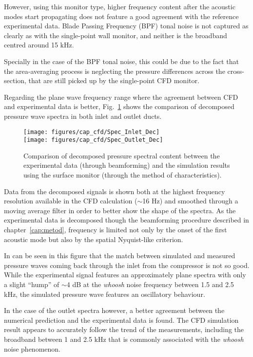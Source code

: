 However, using this monitor type, higher frequency content after the acoustic modes start propagating does not feature a good agreement with the reference experimental data. Blade Passing Frequency (BPF) tonal noise is not captured as clearly as with the single-point wall monitor, and neither is the broadband centred around 15 kHz. 

Specially in the case of the BPF tonal noise, this could be due to the fact that the area-averaging process is neglecting the pressure differences across the cross-section, that are still picked up by the single-point CFD monitor.

Regarding the plane wave frequency range where the agreement between CFD and experimental data is better, Fig.~\ref{fig:cfd_Spec_PlaneW_Dec} shows the comparison of decomposed pressure wave spectra in both inlet and outlet ducts. 

\begin{figure}[htb!]
\centering
\texttt{[image: figures/cap\_cfd/Spec\_Inlet\_Dec]}\\[5mm]
\texttt{[image: figures/cap\_cfd/Spec\_Outlet\_Dec]}
\caption{Comparison of decomposed pressure spectral content between the experimental data (through beamforming) and the simulation results using the surface monitor (through the method of characteristics).}
\label{fig:cfd_Spec_PlaneW_Dec}
\end{figure}

Data from the decomposed signals is shown both at the highest frequency resolution available in the CFD calculation ($\sim$16 Hz) and smoothed through a moving average filter in order to better show the shape of the spectra. As the experimental data is decomposed though the beamforming procedure described in chapter~\ref{cap:metod}, frequency is limited not only by the onset of the first acoustic mode but also by the spatial Nyquist-like criterion.

In can be seen in this figure that the match between simulated and measured pressure waves coming back through the inlet from the compressor is not so good. While the experimental signal features an approximately plane spectra with only a slight ``hump'' of $\sim$4 dB at the \emph{whoosh} noise frequency between 1.5 and 2.5 kHz, the simulated pressure wave features an oscillatory behaviour.

In the case of the outlet spectra however, a better agreement between the numerical prediction and the experimental data is found. The CFD simulation result appears to accurately follow the trend of the measurements, including the broadband between 1 and 2.5 kHz that is commonly associated with the \emph{whoosh} noise phenomenon.

